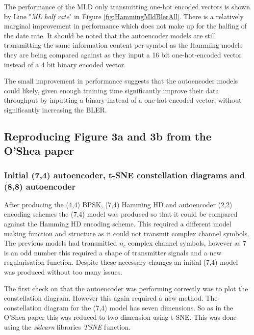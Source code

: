 \documentclass[12pt,onecolumn,letterpaper]{article}
\newcommand{\code}{\textit}
\begin{document}
The performance of the MLD only transmitting one-hot encoded vectors is shown by Line "\textit{ML half rate}" in Figure \ref{fig:HammingMldBlerAll}. There is a relatively marginal improvement in performance which does not make up for the halfing of the date rate. It should be noted that the autoencoder models are still transmitting the same information content per symbol as the Hamming models they are being compared against as they input a 16 bit one-hot-encoded vector instead of a 4 bit binary encoded vector.

The small improvement in performance suggests that the autoencoder models could likely, given enough training time significantly improve their data throughput by inputting a binary instead of a one-hot-encoded vector, without significantly increasing the BLER.

\subsection{Reproducing Figure 3a and 3b from the O'Shea paper}

\subsubsection{Initial (7,4) autoencoder, t-SNE constellation diagrams and (8,8) autoencoder}

After producing the (4,4) BPSK, (7,4) Hamming HD and autoencoder (2,2) encoding schemes the (7,4) model was produced so that it could be compared against the Hamming HD encoding scheme. This required a different model making function and structure as it could not transmit complex channel symbols. The previous models had transmitted $n_c$ complex channel symbols, however as 7 is an odd number this required a shape of transmitter signals and a new regularisation function. Despite these necessary changes an initial (7,4) model was produced without too many issues. 

The first check on that the autoencoder was performing correctly was to plot the constellation diagram. However this again required a new method. The constellation diagram for the (7,4) model has seven dimensions. So as in the O'Shea paper this was reduced to two dimension using t-SNE. This was done using the \code{sklearn} libraries \code{TSNE} function. 
\end{document}
